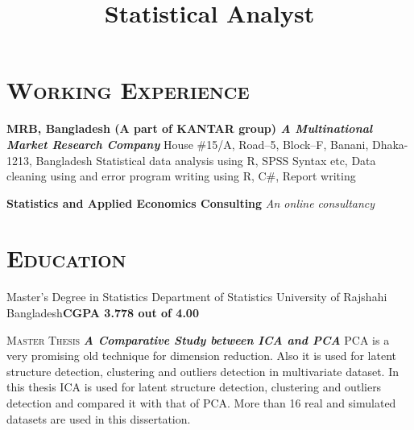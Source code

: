 \documentclass[10pt,a4paper]{moderncv}
\title     {Statistical Analyst}
\begin{document}
		
	\let\ssection\section
	\renewcommand{\section}[1]{\vspace*{-2ex}\ssection{#1}}
	\maketitle
		\section{\textsc{Working Experience}}
		 {\textbf{MRB, Bangladesh (A part of KANTAR group)\newline
				\textit{A Multinational Market Research Company}}}
		 {House \#15/A, Road--5, Block--F, Banani, Dhaka-1213, Bangladesh}
		 {Statistical data analysis using R, SPSS Syntax etc, Data cleaning using and error program writing using R, C\#, Report writing}
		
			
		{\textbf{Statistics and Applied Economics Consulting}\newline
			\textit{An online consultancy}}
		
		
	\section{\textsc{Education}}
	{Master's Degree  in Statistics}
	{\newline Department of Statistics}
	{University of Rajshahi}
	{Bangladesh}{\textbf{CGPA 3.778 out of 4.00}}

	
	\cvitem{---}
	{\textsc{Master Thesis}}
	{\emph{\textbf{ A Comparative Study between ICA and PCA}}}
	{\small PCA is a very promising old technique for dimension reduction. Also it is used for latent structure detection, clustering and outliers detection in multivariate dataset. In this thesis ICA is used for latent structure detection, clustering and outliers detection and compared it with that of PCA. More than 16 real and simulated datasets are used in this dissertation.}
	
\end{document}
